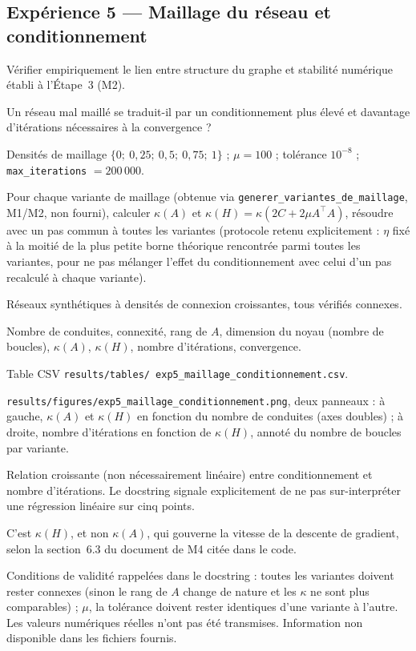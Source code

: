 \documentclass[11pt,a4paper]{article}
\begin{document}
\subsection{Expérience 5 --- Maillage du réseau et conditionnement}

\begin{description}[style=nextline]
  \item[Objectif] Vérifier empiriquement le lien entre structure du graphe
  et stabilité numérique établi à l'Étape~3 (M2).
  \item[Question scientifique] Un réseau mal maillé se traduit-il par un
  conditionnement plus élevé et davantage d'itérations nécessaires à la
  convergence ?
  \item[Paramètres contrôlés] Densités de maillage $\{0;\ 0{,}25;\ 0{,}5;\
  0{,}75;\ 1\}$ ; $\mu = 100$ ; tolérance $10^{-8}$ ; \texttt{max\_iterations}
  $= 200\,000$.
  \item[Méthode] Pour chaque variante de maillage (obtenue via
  \texttt{generer\_variantes\_de\_maillage}, M1/M2, non fourni), calculer
  $\kappa(A)$ et $\kappa(H) = \kappa(2C + 2\mu A^\top A)$, résoudre avec un
  pas commun à toutes les variantes (protocole retenu explicitement : $\eta$
  fixé à la moitié de la plus petite borne théorique rencontrée parmi toutes
  les variantes, pour ne pas mélanger l'effet du conditionnement avec celui
  d'un pas recalculé à chaque variante).
  \item[Protocole expérimental] Réseaux synthétiques à densités de connexion
  croissantes, tous vérifiés connexes.
  \item[Métriques] Nombre de conduites, connexité, rang de $A$, dimension du
  noyau (nombre de boucles), $\kappa(A)$, $\kappa(H)$, nombre d'itérations,
  convergence.
  \item[Sorties produites] Table CSV \texttt{results/tables/
  exp5\_maillage\_conditionnement.csv}.
  \item[Figures] \texttt{results/figures/exp5\_maillage\_conditionnement.png},
  deux panneaux : à gauche, $\kappa(A)$ et $\kappa(H)$ en fonction du nombre
  de conduites (axes doubles) ; à droite, nombre d'itérations en fonction de
  $\kappa(H)$, annoté du nombre de boucles par variante.
  \item[Interprétation attendue] Relation croissante (non nécessairement
  linéaire) entre conditionnement et nombre d'itérations. Le docstring
  signale explicitement de ne pas sur-interpréter une régression linéaire
  sur cinq points.
  \item[Lien avec la théorie] C'est $\kappa(H)$, et non $\kappa(A)$, qui
  gouverne la vitesse de la descente de gradient, selon la section~6.3 du
  document de M4 citée dans le code.
  \item[Limites] Conditions de validité rappelées dans le docstring : toutes
  les variantes doivent rester connexes (sinon le rang de $A$ change de
  nature et les $\kappa$ ne sont plus comparables) ; $\mu$, la tolérance
  doivent rester identiques d'une variante à l'autre. Les valeurs numériques
  réelles n'ont pas été transmises. Information non disponible dans les
  fichiers fournis.
\end{description}
\end{document}
